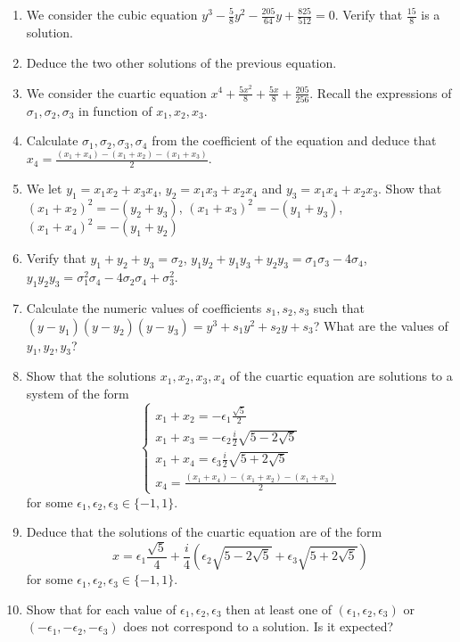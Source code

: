\begin{enumerate}
\item We consider the cubic equation $y^3-\frac{5}{8} y^2 - \frac{205}{64} y
  + \frac{825}{512} = 0$. Verify that $\frac{15}{8}$ is a solution.
\item Deduce the two other solutions of the previous equation.
\item We consider the cuartic equation
  $x^4+\frac{5x^2}{8}+\frac{5x}{8}+\frac{205}{256}$.  Recall the expressions of
  $\sigma_1,\sigma_2,\sigma_3$ in function of $x_1,x_2,x_3$.
\item Calculate $\sigma_1,\sigma_2,\sigma_3, \sigma_4$
  from the coefficient of the equation and
  deduce that $x_4=\frac{{(x_1+x_4)} - {(x_1+x_2)} - {(x_1+x_3)}}{2}$.
\item We let $y_1=x_1x_2+x_3x_4$, $y_2=x_1x_3+x_2x_4$ and $y_3=x_1x_4+x_2x_3$.
  Show that ${(x_1+x_2)}^2 = -{(y_2+y_3)}$,
  ${(x_1+x_3)}^2 = -{(y_1+y_3)}$, ${(x_1+x_4)}^2 = -{(y_1+y_2)}$
\item Verify that $y_1+y_2+y_3=\sigma_2$,
  $y_1y_2+y_1y_3+y_2y_3=\sigma_1\sigma_3-4\sigma_4$,
  $y_1y_2y_3=\sigma_1^2\sigma_4-4\sigma_2\sigma_4+\sigma_3^2$.
\item Calculate the numeric values of coefficients $s_1,s_2,s_3$ such that
  ${(y-y_1)}{(y-y_2)}{(y-y_3)}=y^3 + s_1y^2+s_2y + s_3$? What are the
  values of $y_1,y_2,y_3$?
\item Show that the solutions $x_1,x_2,x_3,x_4$ of the cuartic equation are
  solutions to a system of the form
  $$
  \left\{
  \begin{gathered}
    x_1+x_2=-\epsilon_1\frac{\sqrt{5}}{2} \\
    x_1+x_3=-\epsilon_2\frac{i}{2}\sqrt{5-2\sqrt{5}} \\
    x_1+x_4=\epsilon_3\frac{i}{2}\sqrt{5+2\sqrt{5}} \\
    x_4=\frac{{(x_1+x_4)} - {(x_1+x_2)} - {(x_1+x_3)}}{2}
  \end{gathered}
  \right.
  $$
  for some $\epsilon_1,\epsilon_2,\epsilon_3 \in \{ -1, 1 \}$.
\item Deduce that the solutions of the cuartic equation are of the form
    $$x=\epsilon_1\frac{\sqrt{5}}{4}+
    \frac{i}{4} \left(\epsilon_2 \sqrt{5-2\sqrt{5}}+
    \epsilon_3 \sqrt{5+2\sqrt{5}} \right)$$
  for some $\epsilon_1,\epsilon_2,\epsilon_3 \in \{ -1, 1 \}$.
\item Show that for each value of $\epsilon_1,\epsilon_2,\epsilon_3$
  then at least one of $(\epsilon_1,\epsilon_2,\epsilon_3)$ or
  $(-\epsilon_1,-\epsilon_2,-\epsilon_3)$ does not correspond to a solution.
  Is it expected?
\end{enumerate}

